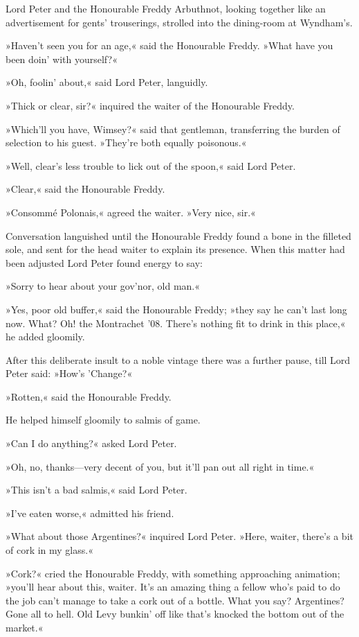 Lord Peter and the Honourable Freddy Arbuthnot, looking together like an advertisement for gents' trouserings, strolled into the dining-room at Wyndham's.

»Haven't seen you for an age,« said the Honourable Freddy. »What have you been doin' with yourself?«

»Oh, foolin' about,« said Lord Peter, languidly.

»Thick or clear, sir?« inquired the waiter of the Honourable Freddy.

»Which'll you have, Wimsey?« said that gentleman, transferring the burden of selection to his guest. »They're both equally poisonous.«

»Well, clear's less trouble to lick out of the spoon,« said Lord Peter.

»Clear,« said the Honourable Freddy.

»Consommé Polonais,« agreed the waiter. »Very nice, sir.«

Conversation languished until the Honourable Freddy found a bone in the filleted sole, and sent for the head waiter to explain its presence. When this matter had been adjusted Lord Peter found energy to say:

»Sorry to hear about your gov'nor, old man.«

»Yes, poor old buffer,« said the Honourable Freddy; »they say he can't last long now. What? Oh! the Montrachet '08. There's nothing fit to drink in this place,« he added gloomily.

After this deliberate insult to a noble vintage there was a further pause, till Lord Peter said: »How's 'Change?«

»Rotten,« said the Honourable Freddy.

He helped himself gloomily to salmis of game.

»Can I do anything?« asked Lord Peter.

»Oh, no, thanks\allowbreak---\allowbreak very decent of you, but it'll pan out all right in time.«

»This isn't a bad salmis,« said Lord Peter.

»I've eaten worse,« admitted his friend.

»What about those Argentines?« inquired Lord Peter. »Here, waiter, there's a bit of cork in my glass.«

»Cork?« cried the Honourable Freddy, with something approaching animation; »you'll hear about this, waiter. It's an amazing thing a fellow who's paid to do the job can't manage to take a cork out of a bottle. What you say? Argentines? Gone all to hell. Old Levy bunkin' off like that's knocked the bottom out of the market.«

